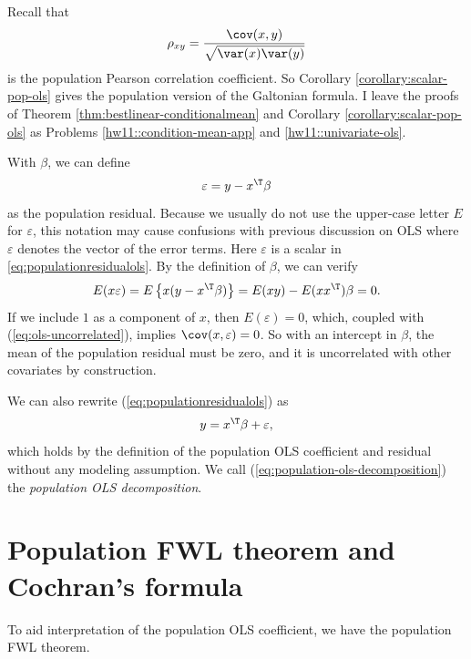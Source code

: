 Recall that 
$$
\rho_{xy}  = \frac{   \cov(x,y)   }{   \sqrt{   \var(x) \var(y)  }    }
$$
is the population Pearson correlation coefficient. So Corollary \ref{corollary:scalar-pop-ols} gives the population version of the Galtonian formula. 
I leave the proofs of Theorem \ref{thm:bestlinear-conditionalmean} and Corollary \ref{corollary:scalar-pop-ols} as Problems \ref{hw11::condition-mean-app} and \ref{hw11::univariate-ols}.



 
With $\beta$, we can define
\begin{equation}
\varepsilon=y-x^{\T}\beta\label{eq:populationresidualols}
\end{equation}
as the population residual. Because we usually do not use the upper-case letter $E$ for $\varepsilon$, this notation may cause confusions with previous discussion on OLS where $\varepsilon$ denotes the vector of the error terms. Here $\varepsilon$ is a scalar in \eqref{eq:populationresidualols}.   
By the definition of $\beta$, we can verify
\begin{equation}
E(x\varepsilon)=E\left\{ x(y-x^{\T}\beta)\right\} =E(xy)-E(xx^{\T})\beta=0.\label{eq:ols-uncorrelated}
\end{equation}
If we include $1$ as a component of $x$, then $E(\varepsilon)=0$,
which, coupled with (\ref{eq:ols-uncorrelated}), implies $\cov(x,\varepsilon)=0$.
So with an intercept in $\beta$, the mean of the population residual
must be zero, and it is uncorrelated with other covariates by construction. 

We can also rewrite (\ref{eq:populationresidualols}) as
\begin{equation}
y=x^{\T}\beta+\varepsilon,\label{eq:population-ols-decomposition}
\end{equation}
which holds by the definition of the population OLS coefficient and residual without any modeling
assumption. We call (\ref{eq:population-ols-decomposition}) the {\it  population
OLS decomposition}. 


\section{Population FWL theorem and Cochran's formula}



To aid interpretation of the population OLS coefficient, we have the
population FWL theorem.


